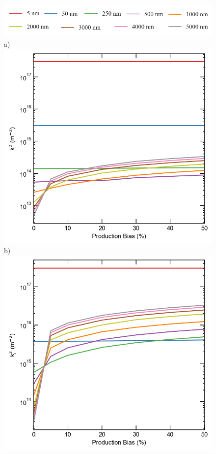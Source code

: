 \documentclass[utf8]{frontiersSCNS} %
\begin{document}
    \begin{figure}[h!]  %
    \centering
        \includegraphics[scale=0.3]{Fig_legend}\\
        a)\includegraphics[scale=0.55]{Fig11_a}
        b)\includegraphics[scale=0.55]{Fig11_b}

\end{figure}
\end{document}
